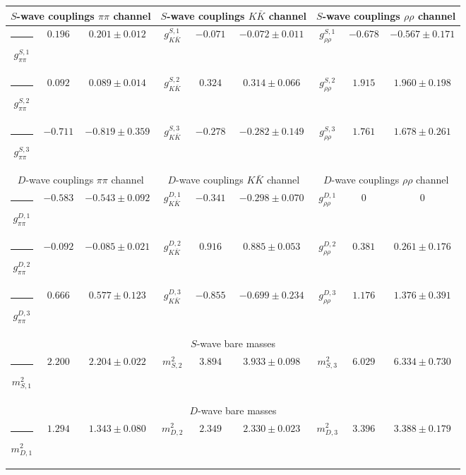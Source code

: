 \begin{table}[h]
\begin{ruledtabular}
\begin{tabular}{c c c c c c c c c}
\multicolumn{3}{c}{$S$-wave couplings $\pi \pi$ channel}  & \multicolumn{3}{c}{$S$-wave couplings $K  \bar K$ channel} & \multicolumn{3}{c}{$S$-wave couplings $\rho\rho$ channel} \\ \hline
\rule[-0.2cm]{-0.1cm}{.55cm} $g^{S,1}_{\pi\pi}$ & $0.196$ & $0.201 \pm 0.012$ & $g^{S,1}_{K\bar K}$ & $-0.071$ & $-0.072 \pm 0.011$ & $g^{S,1}_{\rho\rho}$ & $-0.678$ & $-0.567 \pm 0.171$ \\
\rule[-0.2cm]{-0.1cm}{.55cm} $g^{S,2}_{\pi\pi}$ & $0.092$ & $0.089 \pm 0.014$ & $g^{S,2}_{K\bar K}$ & $0.324$ & $0.314 \pm 0.066$ & $g^{S,2}_{\rho\rho}$ & $1.915$ & $1.960 \pm 0.198$ \\
\rule[-0.2cm]{-0.1cm}{.55cm} $g^{S,3}_{\pi\pi}$ & $-0.711$ & $-0.819 \pm 0.359$ & $g^{S,3}_{K\bar K}$ & $-0.278$ & $-0.282 \pm 0.149$ & $g^{S,3}_{\rho\rho}$ & $1.761$ & $1.678 \pm 0.261$ \\
\hline 
\multicolumn{3}{c}{$D$-wave couplings $\pi \pi$ channel}  & \multicolumn{3}{c}{$D$-wave couplings $K  \bar K$ channel} & \multicolumn{3}{c}{$D$-wave couplings $\rho\rho$ channel} \\ \hline
\rule[-0.2cm]{-0.1cm}{.55cm} $g^{D,1}_{\pi\pi}$ & $-0.583$ & $-0.543 \pm 0.092$ & $g^{D,1}_{K\bar K}$ & $-0.341$ & $-0.298 \pm 0.070$ & $g^{D,1}_{\rho\rho}$ & $0$ & $0$ \\
\rule[-0.2cm]{-0.1cm}{.55cm} $g^{D,2}_{\pi\pi}$ & $-0.092$ & $-0.085 \pm 0.021$ & $g^{D,2}_{K\bar K}$ & $0.916$ & $0.885 \pm 0.053$ & $g^{D,2}_{\rho\rho}$ & $0.381$ & $0.261 \pm 0.176$ \\
\rule[-0.2cm]{-0.1cm}{.55cm} $g^{D,3}_{\pi\pi}$ & $0.666$ & $0.577 \pm 0.123$ & $g^{D,3}_{K\bar K}$ & $-0.855$ & $-0.699 \pm 0.234$ & $g^{D,3}_{\rho\rho}$ & $1.176$ & $1.376 \pm 0.391$ \\
\hline 
\multicolumn{9}{c}{$S$-wave bare masses}   \\ \hline
\rule[-0.2cm]{-0.1cm}{.55cm} $m^2_{S,1}$ & $2.200$ & $2.204 \pm 0.022$ & $m^2_{S,2}$ & $3.894$ & $3.933 \pm 0.098$ & $m^2_{S,3}$ & $6.029$ & $6.334 \pm 0.730$ \\
\hline 
\multicolumn{9}{c}{$D$-wave bare masses}   \\ \hline
\rule[-0.2cm]{-0.1cm}{.55cm} $m^2_{D,1}$ & $1.294$ & $1.343 \pm 0.080$ & $m^2_{D,2}$ & $2.349$ & $2.330 \pm 0.023$ & $m^2_{D,3}$ & $3.396$ & $3.388 \pm 0.179$ \\

\end{tabular}
\end{ruledtabular}
\end{table}
